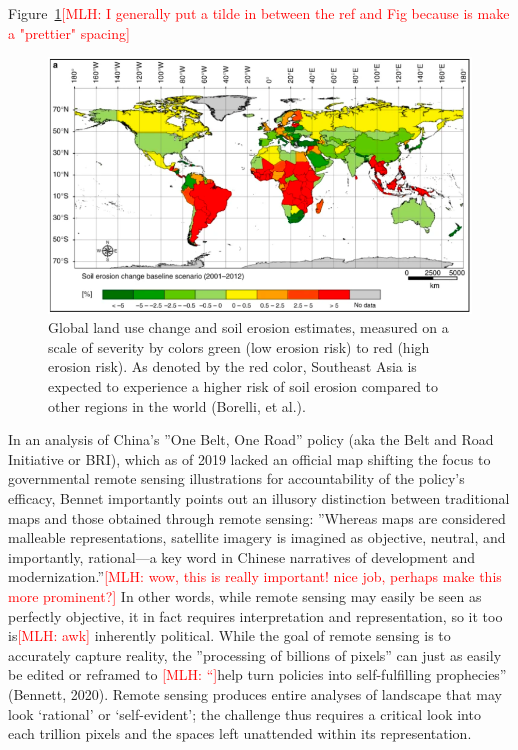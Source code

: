 \documentclass{book}\usepackage{knitr}
\newcommand{\red}[1]{\textcolor{red}{[MLH: #1]}}
\begin{document}
\begin{knitrout}
\begin{kframe}
Figure~\ref{fig:Bonelli Erosion Map}\red{I generally put a tilde in between the ref and Fig because is make a "prettier" spacing}

\begin{figure}
\includegraphics[width=\linewidth]{images/land-use/Bonelli_Erosion_Map.png}
\caption{Global land use change and soil erosion estimates, measured on a scale of severity by colors green (low erosion risk) to red (high erosion risk). As denoted by the red color, Southeast Asia is expected to experience a higher risk of soil erosion compared to other regions in the world (Borelli, et al.).}
\label{fig:Bonelli Erosion Map}
\end{figure}

In an analysis of China’s ''One Belt, One Road'' policy (aka the Belt and Road Initiative or BRI), which as of 2019 lacked an official map shifting the focus to governmental remote sensing illustrations for accountability of the policy’s efficacy, Bennet importantly points out an illusory distinction between traditional maps and those obtained through remote sensing: ''Whereas maps are considered malleable representations, satellite imagery is imagined as objective, neutral, and importantly, rational—a key word in Chinese narratives of development and modernization.''\red{wow, this is really important! nice job, perhaps make this more prominent?} In other words, while remote sensing may easily be seen as perfectly objective, it in fact requires interpretation and representation, so it too is\red{awk} inherently political. While the goal of remote sensing is to accurately capture reality, the ''processing of billions of pixels'' can just as easily be edited or reframed to \red{“}help turn policies into self-fulfilling prophecies” (Bennett, 2020). Remote sensing produces entire analyses of landscape that may look ‘rational’ or ‘self-evident’; the challenge thus requires a critical look into each trillion pixels and the spaces left unattended within its representation.


\end{kframe}
\end{knitrout}
\end{document}
